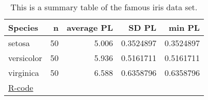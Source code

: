 \begin{table}

\caption{\label{tab:}This is a summary table of the famous iris data set.
        }
\centering
\begin{tabular}[t]{lrrrr}
\toprule
Species & n & average PL & SD PL & min PL\\
\midrule
setosa & 50 & 5.006 & 0.3524897 & 0.3524897\\
versicolor & 50 & 5.936 & 0.5161711 & 0.5161711\\
virginica & 50 & 6.588 & 0.6358796 & 0.6358796\\
\bottomrule
\multicolumn{5}{l}{\href{https://github.com/TobiasRoth/RtoAuthorea/blob/master/tables/latex_table/latex_table.R}{R-code}}\\
\end{tabular}
\end{table}
